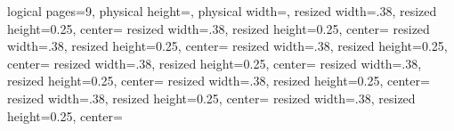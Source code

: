 \pgfpagesphysicalpageoptions%
{
logical pages=9,
physical height=\paperwidth,
physical width=\paperheight,
}
{
resized width=.38\pgfphysicalwidth,
resized height=0.25\pgfphysicalheight,
center=\pgfpoint{0.23\pgfphysicalwidth}{0.85\pgfphysicalheight}
}
{
resized width=.38\pgfphysicalwidth,
resized height=0.25\pgfphysicalheight,
center=\pgfpoint{.64\pgfphysicalwidth}{.85\pgfphysicalheight}
}
{
resized width=.38\pgfphysicalwidth,
resized height=0.25\pgfphysicalheight,
center=\pgfpoint{1.05\pgfphysicalwidth}{.85\pgfphysicalheight}
}
{
resized width=.38\pgfphysicalwidth,
resized height=0.25\pgfphysicalheight,
center=\pgfpoint{.23\pgfphysicalwidth}{.615\pgfphysicalheight}
}
{
resized width=.38\pgfphysicalwidth,
resized height=0.25\pgfphysicalheight,
center=\pgfpoint{.64\pgfphysicalwidth}{.615\pgfphysicalheight}
}
{
resized width=.38\pgfphysicalwidth,
resized height=0.25\pgfphysicalheight,
center=\pgfpoint{1.05\pgfphysicalwidth}{.615\pgfphysicalheight}
}
{
resized width=.38\pgfphysicalwidth,
resized height=0.25\pgfphysicalheight,
center=\pgfpoint{.23\pgfphysicalwidth}{.38\pgfphysicalheight}
}
{
resized width=.38\pgfphysicalwidth,
resized height=0.25\pgfphysicalheight,
center=\pgfpoint{.64\pgfphysicalwidth}{.38\pgfphysicalheight}
}
{
resized width=.38\pgfphysicalwidth,
resized height=0.25\pgfphysicalheight,
center=\pgfpoint{1.05\pgfphysicalwidth}{.38\pgfphysicalheight}
}

